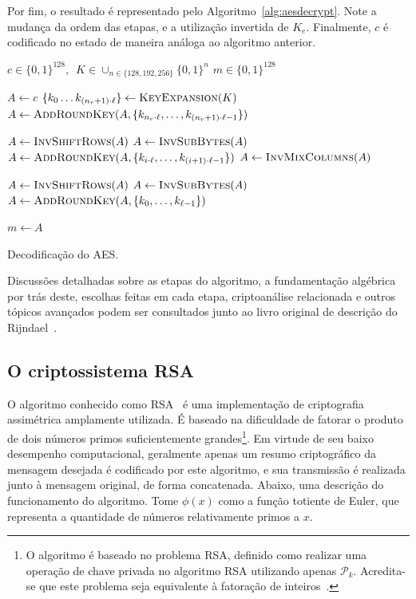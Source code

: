\documentclass{ufsctex/ufsctex}
\newcommand{\pk}{\mathcal{P}_{k}}
\newcommand{\binwds}[1]{\{0, 1\}^{#1}}
\begin{document}
Por fim, o resultado é representado pelo Algoritmo~\ref{alg:aesdecrypt}. Note a
mudança da ordem das etapas, e a utilização invertida de $K_{e}$. Finalmente,
$c$ é codificado no estado de maneira análoga ao algoritmo anterior.

\begin{algorithm}
  \begin{algorithmic}
    \REQUIRE{}  $c \in \binwds{128}, \enspace
      K \in \cup_{n \in \{128, 192, 256\}} \binwds{n}$
    \ENSURE{}  $m \in \binwds{128}$ 

    \STATE{}  $A \leftarrow c$
    \STATE{}  $\{k_{0} \dots k_{(n_{r} + 1) \cdot \ell}\}
      \leftarrow \textsc{KeyExpansion}(K)$
    \STATE{}  $A \leftarrow \textsc{AddRoundKey}(A,
      \{k_{n_{r} \cdot \ell}, \dots, k_{(n_{r} + 1) \cdot \ell - 1}\})$

      \STATE{}  $A \leftarrow \textsc{InvShiftRows}(A)$
      \STATE{}  $A \leftarrow \textsc{InvSubBytes}(A)$
      \STATE{}  $A \leftarrow \textsc{AddRoundKey}(A,
        \{k_{i \cdot \ell}, \dots, k_{(i + 1) \cdot \ell - 1}\})$
      \STATE{}  $A \leftarrow \textsc{InvMixColumns}(A)$
    \ENDFOR{}

    \STATE{}  $A \leftarrow \textsc{InvShiftRows}(A)$
    \STATE{}  $A \leftarrow \textsc{InvSubBytes}(A)$
    \STATE{}  $A \leftarrow \textsc{AddRoundKey}(A,
      \{k_{0}, \dots, k_{\ell - 1}\})$

    \STATE{}  $m \leftarrow A$
  \end{algorithmic}
  \caption{Decodificação do AES.}\label{alg:aesdecrypt}
\end{algorithm}

Discussões detalhadas sobre as etapas do algoritmo, a fundamentação algébrica
por trás deste, escolhas feitas em cada etapa, criptoanálise relacionada e
outros tópicos avançados podem ser consultados junto ao livro original de
descrição do Rijndael~\cite{Daemen:book:2002}.

\subsection{O criptossistema RSA}\label{subsection:rsa}

O algoritmo conhecido como
RSA~\cite{Rivest:article:1978:feb}
é uma implementação de criptografia assimétrica amplamente utilizada. É baseado
na dificuldade de fatorar o produto de dois números primos suficientemente
grandes\footnote{O algoritmo é baseado no problema RSA, definido como realizar
uma operação de chave privada no algoritmo RSA utilizando apenas $\pk{}$.
Acredita-se que este problema seja equivalente à fatoração de
inteiros~\cite[Fato 3.30]{Menezes:book:1996}.}. Em virtude de seu baixo
desempenho computacional, geralmente apenas um resumo criptográfico da mensagem
desejada é codificado por este algoritmo, e sua transmissão é realizada junto à
mensagem original, de forma concatenada. Abaixo, uma descrição do funcionamento
do algoritmo. Tome $\phi(x)$ como a função totiente de Euler, que representa a
quantidade de números relativamente primos a $x$.
\end{document}
